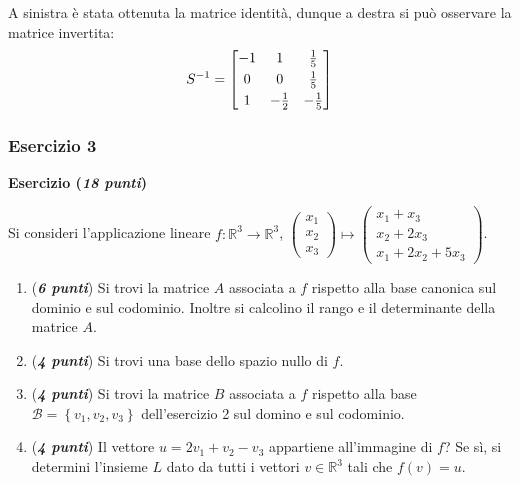 \documentclass[a4paper]{article}
\makeatletter
\newenvironment{rowequmatbra}[1]{\left[\array{@{}#1@{}}}{\endarray\right]}
\makeatother
\begin{document}
	A sinistra è stata ottenuta la matrice identità, dunque a destra si può osservare la matrice invertita:
	\begin{equation*}
		S^{-1} = \begin{rowequmatbra}{ccc}
			-1 & 1 & \frac{1}{5} \\ [0.3em]
			0 & 0 & \frac{1}{5} \\ [0.3em]
			 1 & -\frac{1}{2} & -\frac{1}{5}
		\end{rowequmatbra}
	\end{equation*}\newpage
	
	\subsubsection{Esercizio 3}
	
	\textcolor{Red3}{\textbf{Esercizio (\emph{18 punti})}}\newline
	
	\noindent
	Si consideri l'applicazione lineare $f:\mathbb{R}^{3} \rightarrow \mathbb{R}^{3}$, $
	\begin{pmatrix}
		x_{1} \\
		x_{2} \\
		x_{3}
	\end{pmatrix}
	\mapsto
	\begin{pmatrix}
		x_{1} + x_{3} 	\\
		x_{2} + 2x_{3} 	\\
		x_{1} + 2x_{2} + 5x_{3}
	\end{pmatrix}$.
	\begin{enumerate}[label=(\alph*)]
		\item (\textbf{\emph{6 punti}}) Si trovi la matrice $A$ associata a $f$ rispetto alla base canonica sul dominio e sul codominio. Inoltre si calcolino il rango e il determinante della matrice $A$.
		
		\item (\textbf{\emph{4 punti}}) Si trovi una base dello spazio nullo di $f$.
		
		\item (\textbf{\emph{4 punti}}) Si trovi la matrice $B$ associata a $f$ rispetto alla base $\mathcal{B} = \left\{v_{1}, v_{2}, v_{3}\right\}$ dell'esercizio 2 sul domino e sul codominio.
		
		\item (\textbf{\emph{4 punti}}) Il vettore $u = 2v_{1} + v_{2} - v_{3}$ appartiene all'immagine di $f$? Se sì, si determini l'insieme $L$ dato da tutti i vettori $v \in \mathbb{R}^{3}$ tali che $f\left(v\right) = u$.
	\end{enumerate}
	
\end{document}
